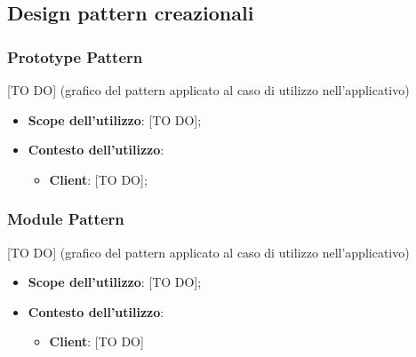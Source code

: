 %


\subsection{Design pattern creazionali} %
\label{sub:design_pattern_creazionali}
	\subsubsection{Prototype Pattern} %
	\label{ssub:prototype_pattern}
	[TO DO] (grafico del pattern applicato al caso di utilizzo nell'applicativo)
		\begin{itemize}
			\item \textbf{Scope dell'utilizzo}: [TO DO];
			\item \textbf{Contesto dell'utilizzo}:
				\begin{itemize}
					\item \textbf{Client}: [TO DO];
				\end{itemize}
		\end{itemize}

	\subsubsection{Module Pattern} %
	\label{ssub:module_pattern}
	[TO DO] (grafico del pattern applicato al caso di utilizzo nell'applicativo)
		\begin{itemize}
			\item \textbf{Scope dell'utilizzo}: [TO DO];
			\item \textbf{Contesto dell'utilizzo}:
				\begin{itemize}
					\item \textbf{Client}: [TO DO]
				\end{itemize}
		\end{itemize}

